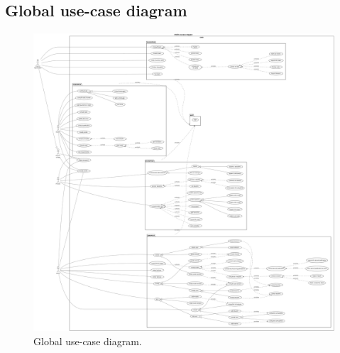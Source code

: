 \documentclass[]{uc2pfecaneva}
\begin{document}
\subsection{Global use-case diagram}

     \begin{figure}[ht]
	
	\centering
	\includegraphics[width=\textwidth]{images/GUCD}
	
	\caption{Global use-case diagram.}
	\end{figure}
\clearpage
\end{document}

